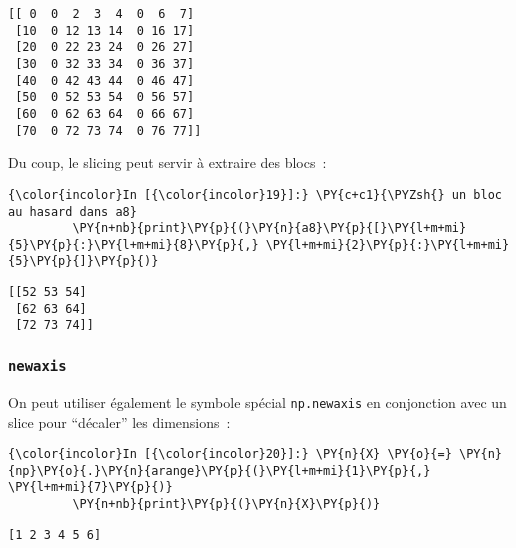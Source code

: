     \begin{Verbatim}[commandchars=\\\{\},frame=single,framerule=0.3mm,rulecolor=\color{cellframecolor}]
[[ 0  0  2  3  4  0  6  7]
 [10  0 12 13 14  0 16 17]
 [20  0 22 23 24  0 26 27]
 [30  0 32 33 34  0 36 37]
 [40  0 42 43 44  0 46 47]
 [50  0 52 53 54  0 56 57]
 [60  0 62 63 64  0 66 67]
 [70  0 72 73 74  0 76 77]]
\end{Verbatim}

    Du coup, le slicing peut servir à extraire des blocs~:

    \begin{Verbatim}[commandchars=\\\{\},frame=single,framerule=0.3mm,rulecolor=\color{cellframecolor}]
{\color{incolor}In [{\color{incolor}19}]:} \PY{c+c1}{\PYZsh{} un bloc au hasard dans a8}
         \PY{n+nb}{print}\PY{p}{(}\PY{n}{a8}\PY{p}{[}\PY{l+m+mi}{5}\PY{p}{:}\PY{l+m+mi}{8}\PY{p}{,} \PY{l+m+mi}{2}\PY{p}{:}\PY{l+m+mi}{5}\PY{p}{]}\PY{p}{)}
\end{Verbatim}


    \begin{Verbatim}[commandchars=\\\{\},frame=single,framerule=0.3mm,rulecolor=\color{cellframecolor}]
[[52 53 54]
 [62 63 64]
 [72 73 74]]
\end{Verbatim}

    \hypertarget{newaxis}{%
\subsubsection{\texorpdfstring{\texttt{newaxis}}{newaxis}}\label{newaxis}}

    On peut utiliser également le symbole spécial \texttt{np.newaxis} en
conjonction avec un slice pour ``décaler'' les dimensions~:

    \begin{Verbatim}[commandchars=\\\{\},frame=single,framerule=0.3mm,rulecolor=\color{cellframecolor}]
{\color{incolor}In [{\color{incolor}20}]:} \PY{n}{X} \PY{o}{=} \PY{n}{np}\PY{o}{.}\PY{n}{arange}\PY{p}{(}\PY{l+m+mi}{1}\PY{p}{,} \PY{l+m+mi}{7}\PY{p}{)}
         \PY{n+nb}{print}\PY{p}{(}\PY{n}{X}\PY{p}{)}
\end{Verbatim}


    \begin{Verbatim}[commandchars=\\\{\},frame=single,framerule=0.3mm,rulecolor=\color{cellframecolor}]
[1 2 3 4 5 6]
\end{Verbatim}

